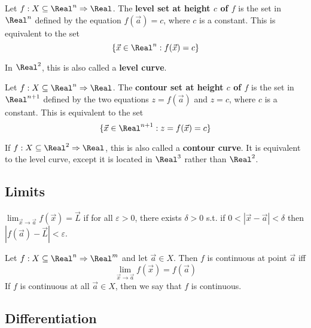 \begin{definition}
  Let $f : X \subseteq \Real^n \Rightarrow \Real$. The \textbf{level set at height $c$ of $f$} is the set in $\Real^n$ defined by the equation $f(\vec{a}) = c$, where $c$ is a constant. This is equivalent to the set
  \[
    \{ \vec{x} \in \Real^n : f(\vec{x}) = c \}
  \]

  In $\Real^2$, this is also called a \textbf{level curve}.
\end{definition}

\begin{definition}
  Let $f : X \subseteq \Real^n \Rightarrow \Real$. The \textbf{contour set at height $c$ of $f$} is the set in $\Real^{n + 1}$ defined by the two equations $z = f(\vec{a})$ and $z = c$, where $c$ is a constant. This is equivalent to the set
  \[
    \{ \vec{x} \in \Real^{n + 1} : z = f(\vec{x}) = c \}
  \]

  If $f : X \subseteq \Real^2 \Rightarrow \Real$, this is also called a \textbf{contour curve}. It is equivalent to the level curve, except it is located in $\Real^3$ rather than $\Real^2$.
\end{definition}


\subsection{Limits}


\begin{definition}[Limit]
  $\lim_{\vec{x} \to \vec{a}} f(\vec{x}) = \vec{L}$ if for all $\varepsilon > 0$, there exists $\delta > 0$ s.t. if $0 < |\vec{x} - \vec{a}| < \delta$ then $|f(\vec{a}) - \vec{L}| < \varepsilon$.
\end{definition}

\begin{definition}[Continuity]
  Let $f : X \subseteq \Real^n \Rightarrow \Real^m$ and let $\vec{a} \in X$. Then $f$ is continuous at point $\vec{a}$ iff
  \[
    \lim_{\vec{x} \to \vec{a}} f(\vec{x}) = f(\vec{a})
  \]
  If $f$ is continuous at all $\vec{a} \in X$, then we say that $f$ is continuous.
\end{definition}

\subsection{Differentiation}

